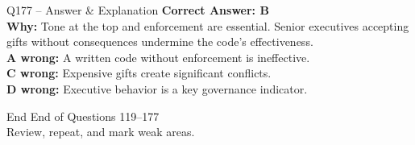 \documentclass[aspectratio=169,10pt]{beamer}
\begin{document}
	\begin{frame}[t]{Q177 -- Answer \& Explanation}
		\small
		\textbf{Correct Answer: B} \\[4pt]
		\textbf{Why:} Tone at the top and enforcement are essential. Senior executives accepting gifts without consequences undermine the code's effectiveness. \\[4pt]
		\textbf{A wrong:} A written code without enforcement is ineffective. \\[2pt]
		\textbf{C wrong:} Expensive gifts create significant conflicts. \\[2pt]
		\textbf{D wrong:} Executive behavior is a key governance indicator.
	\end{frame}
	
	\begin{frame}{End}
		\centering
		\Large End of Questions 119--177\\[8pt]
		\normalsize Review, repeat, and mark weak areas.
	\end{frame}
	
\end{document}
